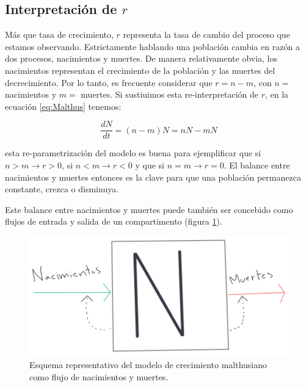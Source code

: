 \documentclass[
]{book}
\begin{document}
\hypertarget{interpretaciuxf3n-de-r}{%
\subsection{\texorpdfstring{Interpretación de \(r\)}{Interpretación de r}}\label{interpretaciuxf3n-de-r}}

Más que tasa de crecimiento, \(r\) representa la tasa de cambio del proceso que estamos observando. Estrictamente hablando una población cambia en razón a dos procesos, nacimientos y muertes. De manera relativamente obvia, los nacimientos representan el crecimiento de la población y las muertes del decrecimiento. Por lo tanto, es frecuente considerar que \(r = n - m\), con \(n=\) nacimientos y \(m=\) muertes. Si sustiuimos esta re-interpretación de \(r\), en la ecuación \eqref{eq:Malthus} tenemos:

\begin{equation}
    \frac{dN}{dt} = (n - m)N = nN - mN
\end{equation}

esta re-parametrización del modelo es buena para ejemplificar que si \(n > m \rightarrow r>0\), si \(n < m \rightarrow r < 0\) y que si \(n = m \rightarrow r = 0\). El balance entre nacimientos y muertes entonces es la clave para que una población permanezca constante, crezca o disminuya.

Este balance entre nacimientos y muertes puede también ser concebido como flujos de entrada y salida de un compartimento (figura \ref{fig:nacim-muert}).

\begin{figure}

{\centering \includegraphics[width=12.42in]{Unidad-IV/Malthus-nacim-muert} 

}

\caption{Esquema representativo del modelo de crecimiento malthusiano como flujo de nacimientos y muertes.}\label{fig:nacim-muert}
\end{figure}
\end{document}
